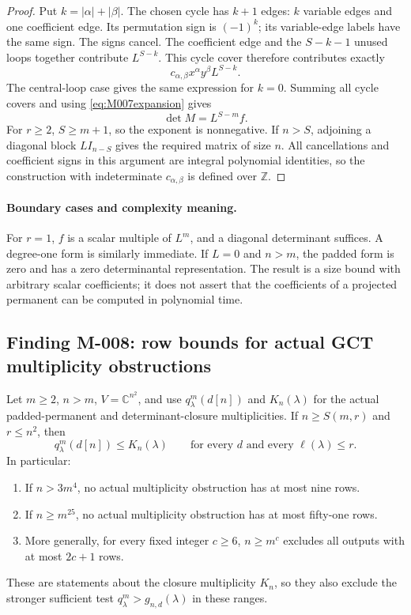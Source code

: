 \begin{proof}
Put \(k=|\alpha|+|\beta|\). The chosen cycle has \(k+1\) edges:
\(k\) variable edges and one coefficient edge.
Its permutation sign is \((-1)^k\); its variable-edge labels
have the same sign. The signs cancel. The coefficient edge
and the \(S-k-1\) unused loops together contribute \(L^{S-k}\).
This cycle cover therefore contributes exactly
\[
                   c_{\alpha,\beta}x^\alpha y^\beta L^{S-k}.
\]
The central-loop case gives the same expression for \(k=0\).
Summing all cycle covers and using \eqref{eq:M007expansion} gives
\[
                                \det M=L^{S-m}f.
\]
For \(r\geq2\), \(S\geq m+1\), so the exponent is nonnegative.
If \(n>S\), adjoining a diagonal block \(L I_{n-S}\) gives the
required matrix of size \(n\).
All cancellations and coefficient signs in this argument are
integral polynomial identities, so the construction with
indeterminate \(c_{\alpha,\beta}\) is defined over \(\mathbb Z\).
\end{proof}

\paragraph{Boundary cases and complexity meaning.}
For \(r=1\), \(f\) is a scalar multiple of \(L^m\), and a
diagonal determinant suffices. A degree-one form is similarly
immediate. If \(L=0\) and \(n>m\), the padded form is zero and
has a zero determinantal representation.
The result is a size bound with arbitrary scalar coefficients;
it does not assert that the coefficients of a projected
permanent can be computed in polynomial time.

\subsection*{Finding M-008: row bounds for actual GCT multiplicity obstructions}
Let \(m\geq2\), \(n>m\), \(V=\mathbb C^{n^2}\), and use
\(q^m_\lambda(d[n])\) and \(K_n(\lambda)\) for the actual
padded-permanent and determinant-closure multiplicities.
If \(n\geq S(m,r)\) and \(r\leq n^2\), then
\begin{equation}\label{eq:M008}
        q^m_\lambda(d[n])\leq K_n(\lambda)
   \qquad\text{for every \(d\) and every \(\ell(\lambda)\leq r\)}.
\end{equation}
In particular:
\begin{enumerate}
\item If \(n>3m^4\), no actual multiplicity obstruction has
      at most nine rows.
\item If \(n\geq m^{25}\), no actual multiplicity obstruction
      has at most fifty-one rows.
\item More generally, for every fixed integer \(c\geq6\),
      \(n\geq m^c\) excludes all outputs with at most \(2c+1\)
      rows.
\end{enumerate}
These are statements about the closure multiplicity \(K_n\),
so they also exclude the stronger sufficient test
\(q^m_\lambda>g_{n,d}(\lambda)\) in these ranges.

